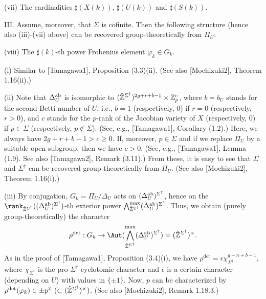 \noindent
{\rm (vii)} The cardinalities $\sharp(X(k))$, $\sharp(U(k))$ and 
$\sharp(S(k))$. 

\smallskip\noindent
{\rm III.} Assume, moreover, that $\Sigma$ is cofinite. Then 
the following structure (hence also {\rm (iii)-(vii)} above) can be 
recovered group-theoretically from $\Pi_U$: 

\noindent
{\rm (viii)} The $\sharp(k)$-th power Frobenius element 
$\varphi_{k}\in G_k$. 

\endproclaim

(i) Similar to [Tamagawa1], Proposition (3.3)(ii). 
(See also [Mochizuki2], Theorem 1.16(ii).) 

\noindent
(ii) Note that $\Delta_U^{\operatorname {ab}}$ is isomorphic to 
$({\hat {\Bbb Z}}^{\Sigma^\dag})^{2g+r+b-1}\times {\Bbb Z}_p^{c}$, 
where $b=b_U$ stands for the second Betti number of $U$, 
i.e., $b=1$ (respectively, $0$) if $r=0$ (respectively, $r>0$), and $c$ stands for 
the $p$-rank of the Jacobian variety of $X$ (respectively, $0$) if 
$p\in\Sigma$ (respectively, $p\not\in\Sigma$). 
(See, e.g., [Tamagawa1], Corollary (1.2).) 
Here, we always have $2g+r+b-1>c\geq 0$. If, moreover, $p\in\Sigma$ 
and if we replace $\Pi_U$ by a suitable open subgroup, then 
we have $c>0$. 
(See, e.g., [Tamagawa1], Lemma (1.9). See also [Tamagawa2], 
Remark (3.11).) From these, it is easy to see that $\Sigma$ and 
$\Sigma^\dag$ can be recovered group-theoretically from $\Pi_U$. 
(See also [Mochizuki2], Theorem 1.16(i).) 

\noindent 
(iii) By conjugation, 
$G_{k}=\Pi_U/\Delta_U$ acts on $(\Delta_U^{\operatorname {ab}})^{\Sigma^\dag}$, 
hence on the 
$\rank_{{\hat {\Bbb Z}}^{\Sigma^\dag}}((\Delta_U^{\ab})^{\Sigma^\dag})$-th 
exterior power $\bigwedge_{{\hat {\Bbb Z}}^{\Sigma^\dag}}^{\max}
(\Delta_U^{\operatorname {ab}})^{\Sigma^\dag}$. 
Thus, we obtain (purely group-theoretically) the character 
$$\rho^{\det}: G_{k}\to 
\Aut(\bigwedge_{{\hat {\Bbb Z}}^{\Sigma^\dag}}^{\max}(\Delta_U^{\ab})^{\Sigma^\dag})
=({\hat {\Bbb Z}}^{\Sigma^\dag})^{\times}.$$ 
As in the proof of [Tamagawa1], Proposition (3.4)(i), we have 
$\rho^{\det}=\epsilon\chi_{\Sigma^\dag}^{g+n+b-1}$, where $\chi_{\Sigma^\dag}$ 
is the pro-$\Sigma^\dag$ cyclotomic character and $\epsilon$ is a certain 
character (depending on $U$) with values in $\{\pm 1\}$. 
Now, $p$ can be characterized by $\rho^{\det}(\varphi_k)\in \pm p^{\Bbb Z}\  
(\subset ({\hat {\Bbb Z}}^{\Sigma^\dag})^{\times})$. 
(See also [Mochizuki2], Remark 1.18.3.) 


